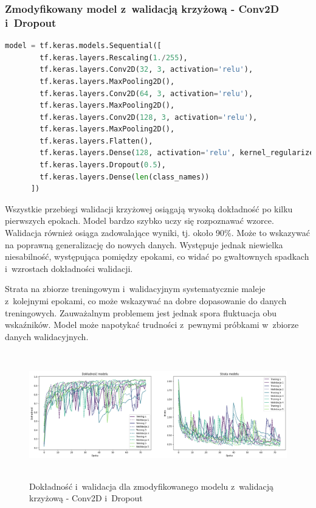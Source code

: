 \subsubsection{Zmodyfikowany model z~walidacją krzyżową - Conv2D i~Dropout}

\begin{lstlisting}[language=Python,caption=Listing zmodyfikowanego skryptu tworzącego model z~walidacją krzyżową - wersja 1,
	label={tests-model-crossval1}]
	model = tf.keras.models.Sequential([
		tf.keras.layers.Rescaling(1./255),
		tf.keras.layers.Conv2D(32, 3, activation='relu'),
		tf.keras.layers.MaxPooling2D(),
		tf.keras.layers.Conv2D(64, 3, activation='relu'),
		tf.keras.layers.MaxPooling2D(),
		tf.keras.layers.Conv2D(128, 3, activation='relu'),
		tf.keras.layers.MaxPooling2D(),
		tf.keras.layers.Flatten(),
		tf.keras.layers.Dense(128, activation='relu', kernel_regularizer=tf.keras.regularizers.l2(0.01)),
		tf.keras.layers.Dropout(0.5),
		tf.keras.layers.Dense(len(class_names))
	  ])
\end{lstlisting}

Wszystkie przebiegi walidacji krzyżowej osiągają wysoką dokładność po kilku pierwszych epokach.
Model bardzo szybko uczy się rozpoznawać wzorce.
Walidacja również osiąga zadowalające wyniki, tj. około 90\%. Może to wskazywać na poprawną generalizację do nowych danych.
Występuje jednak niewielka niesabilność, występująca pomiędzy epokami,
co widać po gwałtownych spadkach i~wzrostach dokładności walidacji.

Strata na zbiorze treningowym i~walidacyjnym systematycznie maleje z~kolejnymi epokami,
co może wskazywać na dobre dopasowanie do danych treningowych.
Zauważalnym problemem jest jednak spora fluktuacja obu wskaźników.
Model może napotykać trudności z~pewnymi próbkami w~zbiorze danych walidacyjnych. 

\begin{figure}[ht]
	\centering
	\includegraphics[height=5.5cm]{resources/tests/images/v4/crossvalid_1_img.png}
	\caption{Dokładność i~walidacja dla zmodyfikowanego modelu z~walidacją krzyżową - Conv2D i~Dropout}
	\label{Fig:tests-cv-1a}
\end{figure}
\FloatBarrier

